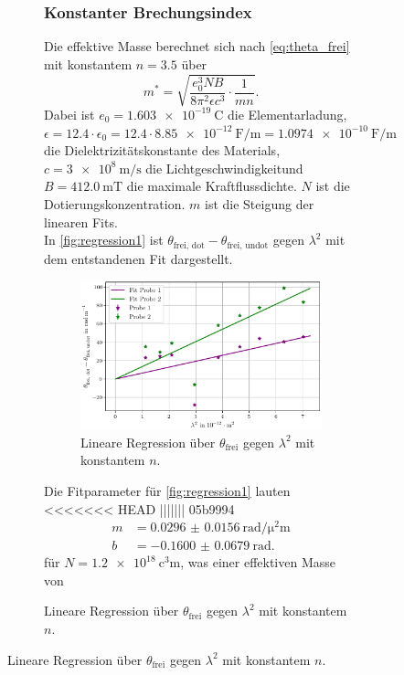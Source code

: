 \begin{figure}[H]
\begin{figure}
\subsubsection{Konstanter Brechungsindex}
Die effektive Masse berechnet sich nach \autoref{eq:theta_frei} mit konstantem $n = \num{3,5}$ über
\begin{equation}
    m^* = \sqrt{\frac{e_0^3 N B}{8 \pi^2 \epsilon c^3} \cdot \frac{1}{mn}}.
\label{eq:masse}
\end{equation}
Dabei ist $e_0 = \qty{1.603e-19}{\coulomb}$ die Elementarladung, $\epsilon = \num{12.4} \cdot \epsilon_0 = \num{12.4} \cdot \qty{8.85e-12}{\farad\per\meter} = \qty{1.0974e-10}{\farad\per\meter}$ die Dielektrizitätskonstante des Materials,
$c= \qty{3e8}{\meter\per\second}$ die Lichtgeschwindigkeitund $B= \qty{412.0}{\milli\tesla}$ die maximale Kraftflussdichte. $N$ ist die Dotierungskonzentration. $m$ ist die Steigung der linearen Fits.\\
In \autoref{fig:regression1} ist $\theta_\text{frei, dot} - \theta_\text{frei, undot}$ gegen $\lambda^2$ mit dem entstandenen Fit dargestellt.
\begin{figure}
    \centering
    \includegraphics[width=\textwidth]{plots/fits_ohne_n.pdf}
    \caption{Lineare Regression über $\theta_\text{frei}$ gegen $\lambda^2$ mit konstantem $n$.}
    \label{fig:regression1}
\end{figure}
Die Fitparameter für \autoref{fig:regression1} lauten
<<<<<<< HEAD
||||||| 05b9994
\begin{align*}
    m &= \qty{0.0296(156)}{\radian\per\square\micro\meter} \\
    b &= \qty{-0.1600(679)}{\radian}.
\end{align*}
für $N = \qty{1.2e18}{\cubic\centi\meter}$, was einer effektiven Masse von

\end{figure}
\end{figure}
